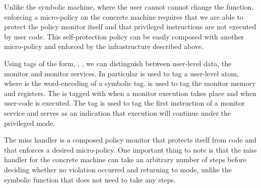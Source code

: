 Unlike the symbolic machine, where the user cannot cannot change the
\TRANSFER function, enforcing a micro-policy on the concrete machine requires
that we are able to protect the policy monitor itself and that privileged
instructions are not executed by user code. This self-protection policy can be
easily composed with another micro-policy and enforced by the infrastructure
described above.

Using tags of the form, , , \MONITOR we can
distinguish between user-level data, the monitor and monitor services.
In particular  is used to tag a user-level atom, where  is
the word-encoding of a symbolic tag. \MONITOR is used to tag the monitor memory
and registers. The \pc is tagged with \MONITOR when a monitor
execution takes place and  when user-code is executed. The tag
 is used to tag the first instruction of a monitor service and
serves as an indication that execution will continue under the privileged
\MONITOR mode. 

The miss handler is a composed policy monitor that protects itself
from \USERname code and that enforces a desired micro-policy.  One
important thing to note is that the miss handler for the concrete
machine can take an arbitrary number of steps before deciding whether
no violation occurred and returning to \USERname mode, unlike the
symbolic \TRANSFER function that does not need to take any steps.

